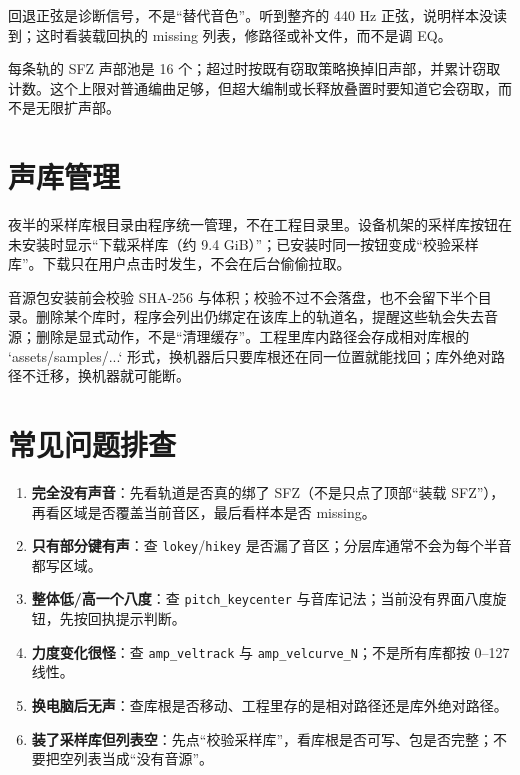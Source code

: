 回退正弦是诊断信号，不是“替代音色”。听到整齐的 440 Hz 正弦，说明样本没读到；这时看装载回执的 missing 列表，修路径或补文件，而不是调 EQ。

每条轨的 SFZ 声部池是 16 个；超过时按既有窃取策略换掉旧声部，并累计窃取计数。这个上限对普通编曲足够，但超大编制或长释放叠置时要知道它会窃取，而不是无限扩声部。


\section{声库管理}

夜半的采样库根目录由程序统一管理，不在工程目录里。设备机架的采样库按钮在未安装时显示“下载采样库（约 9.4 GiB）”；已安装时同一按钮变成“校验采样库”。下载只在用户点击时发生，不会在后台偷偷拉取。

音源包安装前会校验 SHA-256 与体积；校验不过不会落盘，也不会留下半个目录。删除某个库时，程序会列出仍绑定在该库上的轨道名，提醒这些轨会失去音源；删除是显式动作，不是“清理缓存”。工程里库内路径会存成相对库根的 `assets/samples/...` 形式，换机器后只要库根还在同一位置就能找回；库外绝对路径不迁移，换机器就可能断。


\section{常见问题排查}

\begin{enumerate}
  \item \textbf{完全没有声音}：先看轨道是否真的绑了 SFZ（不是只点了顶部“装载 SFZ”），再看区域是否覆盖当前音区，最后看样本是否 missing。
  \item \textbf{只有部分键有声}：查 \texttt{lokey}/\texttt{hikey} 是否漏了音区；分层库通常不会为每个半音都写区域。
  \item \textbf{整体低/高一个八度}：查 \texttt{pitch\_keycenter} 与音库记法；当前没有界面八度旋钮，先按回执提示判断。
  \item \textbf{力度变化很怪}：查 \texttt{amp\_veltrack} 与 \texttt{amp\_velcurve\_N}；不是所有库都按 0–127 线性。
  \item \textbf{换电脑后无声}：查库根是否移动、工程里存的是相对路径还是库外绝对路径。
  \item \textbf{装了采样库但列表空}：先点“校验采样库”，看库根是否可写、包是否完整；不要把空列表当成“没有音源”。
\end{enumerate}

